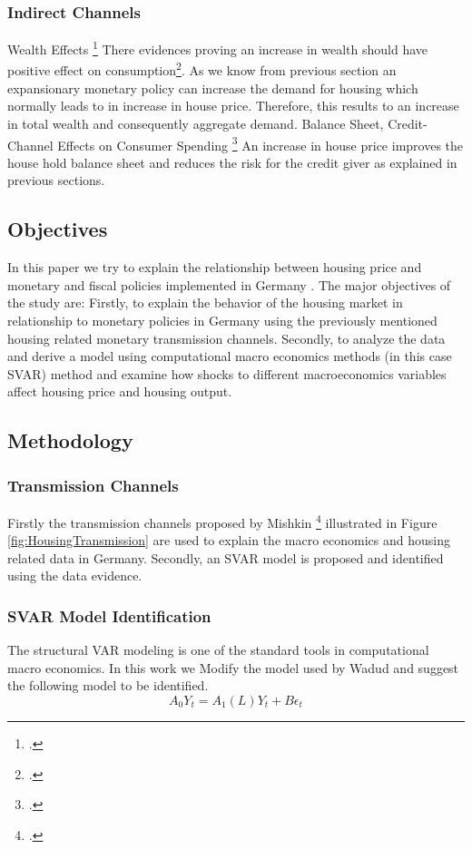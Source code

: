 \subsubsection{Indirect Channels}
Wealth Effects \footcite[See.][]{Mishkin2007}
There evidences proving an increase in wealth should have positive effect on consumption\footcite[See.][]{Mishkin2007}. As we know from previous section an expansionary monetary policy can increase the demand for housing which normally leads to in increase in house price. Therefore, this results to an increase in total wealth and consequently aggregate demand.
Balance Sheet, Credit-Channel Effects on Consumer Spending \footcite[See.][]{Mishkin2007}
An increase in house price improves the house hold balance sheet and reduces the risk for the credit giver as explained in previous sections.



\subsection{Objectives}
In this paper we try to explain the relationship between housing price and monetary and fiscal policies implemented in Germany .
The major objectives of the study are: Firstly, to explain the behavior of the housing market in relationship to monetary policies in Germany using the previously mentioned housing related monetary transmission channels. Secondly, to analyze the data and derive a model using computational macro economics methods (in this case SVAR) method and examine how shocks to different macroeconomics variables affect housing price and housing output.

\subsection{Methodology}
 \subsubsection{Transmission Channels}
Firstly the transmission channels proposed by Mishkin \footcite[See.][]{Mishkin2007} illustrated in Figure \ref{fig:HousingTransmission} are used to explain the macro economics and housing related data in Germany. Secondly, an SVAR model is proposed and identified using the data evidence. 
\subsubsection{SVAR Model Identification}
The structural VAR modeling is one of the standard tools in computational macro economics. In this work we Modify the model used by Wadud \cite[Source: See][]{Wadud2009} and suggest the following model to be identified.
\[ A_0 Y_t = A_1(L) Y_t + B \epsilon_t \]

